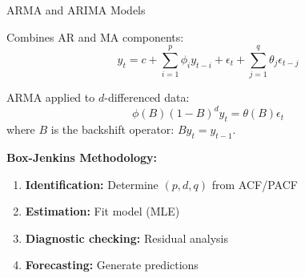 \documentclass[aspectratio=169]{beamer}
\begin{document}
\begin{frame}{ARMA and ARIMA Models}
  \begin{definitionbox}[title={ARMA(p,q) Model}]
    Combines AR and MA components:
    \begin{equation}
      y_t = c + \sum_{i=1}^p \phi_i y_{t-i} + \epsilon_t + \sum_{j=1}^q \theta_j \epsilon_{t-j}
    \end{equation}
  \end{definitionbox}

  \vspace{0.5em}

  \begin{definitionbox}[title={ARIMA(p,d,q) Model}]
    ARMA applied to $d$-differenced data:
    \begin{equation}
      \phi(B)(1-B)^d y_t = \theta(B)\epsilon_t
    \end{equation}
    where $B$ is the backshift operator: $B y_t = y_{t-1}$.
  \end{definitionbox}

  \vspace{0.5em}

  \textbf{Box-Jenkins Methodology:}
  \begin{enumerate}
    \item \textbf{Identification:} Determine $(p,d,q)$ from ACF/PACF
    \item \textbf{Estimation:} Fit model (MLE)
    \item \textbf{Diagnostic checking:} Residual analysis
    \item \textbf{Forecasting:} Generate predictions
  \end{enumerate}
\end{frame}
\end{document}
